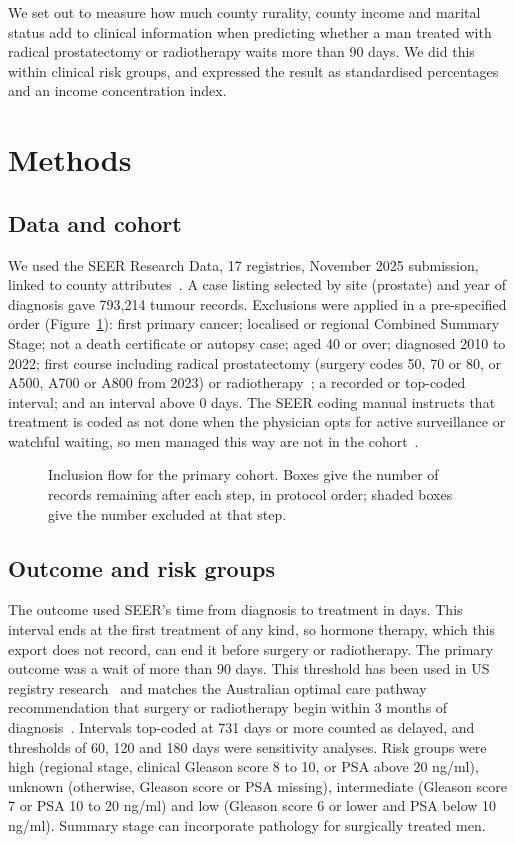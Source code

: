 \documentclass[10pt,a4paper,twocolumn]{article}
\begin{document}
We set out to measure how much county rurality, county income and marital status add to clinical information when predicting whether a man treated with radical prostatectomy or radiotherapy waits more than 90 days. We did this within clinical risk groups, and expressed the result as standardised percentages and an income concentration index.

\section{Methods}

\subsection{Data and cohort}
We used the SEER Research Data, 17 registries, November 2025 submission, linked to county attributes~\cite{seer2025}. A case listing selected by site (prostate) and year of diagnosis gave 793,214 tumour records. Exclusions were applied in a pre-specified order (Figure~\ref{fig:flow}): first primary cancer; localised or regional Combined Summary Stage; not a death certificate or autopsy case; aged 40 or over; diagnosed 2010 to 2022; first course including radical prostatectomy (surgery codes 50, 70 or 80, or A500, A700 or A800 from 2023) or radiotherapy~\cite{seermanual}; a recorded or top-coded interval; and an interval above 0 days. The SEER coding manual instructs that treatment is coded as not done when the physician opts for active surveillance or watchful waiting, so men managed this way are not in the cohort~\cite{seermanual}.

\begin{figure}[t]
\centering

\caption{Inclusion flow for the primary cohort. Boxes give the number of records remaining after each step, in protocol order; shaded boxes give the number excluded at that step.}
\label{fig:flow}
\end{figure}

\subsection{Outcome and risk groups}
The outcome used SEER's time from diagnosis to treatment in days. This interval ends at the first treatment of any kind, so hormone therapy, which this export does not record, can end it before surgery or radiotherapy. The primary outcome was a wait of more than 90 days. This threshold has been used in US registry research~\cite{montielishino2021} and matches the Australian optimal care pathway recommendation that surgery or radiotherapy begin within 3 months of diagnosis~\cite{ocp2021}. Intervals top-coded at 731 days or more counted as delayed, and thresholds of 60, 120 and 180 days were sensitivity analyses. Risk groups were high (regional stage, clinical Gleason score 8 to 10, or PSA above 20 ng/ml), unknown (otherwise, Gleason score or PSA missing), intermediate (Gleason score 7 or PSA 10 to 20 ng/ml) and low (Gleason score 6 or lower and PSA below 10 ng/ml). Summary stage can incorporate pathology for surgically treated men.
\end{document}
